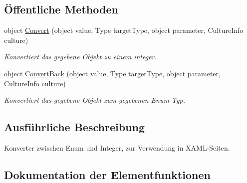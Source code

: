 \subsection*{Öffentliche Methoden}
\begin{DoxyCompactItemize}
\item 
object \mbox{\hyperlink{classmy_m_d_1_1_view_model_1_1_profile_tab_view_model_1_1_int_enum_converter_a73bbd4493664686f44c7411cbb4ac98a}{Convert}} (object value, Type target\+Type, object parameter, Culture\+Info culture)
\begin{DoxyCompactList}\small\item\em Konvertiert das gegebene Objekt zu einem integer. \end{DoxyCompactList}\item 
object \mbox{\hyperlink{classmy_m_d_1_1_view_model_1_1_profile_tab_view_model_1_1_int_enum_converter_a03ac7d0bfe40bd5cb4ffb2f2c7145df7}{Convert\+Back}} (object value, Type target\+Type, object parameter, Culture\+Info culture)
\begin{DoxyCompactList}\small\item\em Konvertiert das gegebene Objekt zum gegebenen Enum-\/\+Typ. \end{DoxyCompactList}\end{DoxyCompactItemize}


\subsection{Ausführliche Beschreibung}
Konverter zwischen Enum und Integer, zur Verwendung in X\+A\+M\+L-\/\+Seiten. 



\subsection{Dokumentation der Elementfunktionen}
\mbox{\label{classmy_m_d_1_1_view_model_1_1_profile_tab_view_model_1_1_int_enum_converter_a73bbd4493664686f44c7411cbb4ac98a}} 
